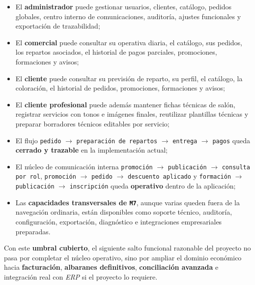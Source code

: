 \begin{itemize}
    \item El \textbf{administrador} puede gestionar usuarios, clientes, catálogo, pedidos globales, centro interno de comunicaciones, auditoría, ajustes funcionales y exportación de trazabilidad;
    \item El \textbf{comercial} puede consultar su operativa diaria, el catálogo, sus pedidos, los repartos asociados, el historial de pagos parciales, promociones, formaciones y avisos;
    \item El \textbf{cliente} puede consultar su previsión de reparto, su perfil, el catálogo, la coloración, el historial de pedidos, promociones, formaciones y avisos;
    \item El \textbf{cliente profesional} puede además mantener fichas técnicas de salón, registrar servicios con tonos e imágenes finales, reutilizar plantillas técnicas y preparar borradores técnicos editables por servicio;
    \item El flujo \texttt{pedido} $\rightarrow$ \texttt{preparación de repartos} $\rightarrow$ \texttt{entrega} $\rightarrow$ \texttt{pagos} queda \textbf{cerrado y trazable} en la implementación actual;
    \item El núcleo de comunicación interna \texttt{promoción} $\rightarrow$ \texttt{publicación} $\rightarrow$ \texttt{consulta por rol}, \texttt{promoción} $\rightarrow$ \texttt{pedido} $\rightarrow$ \texttt{descuento aplicado} y \texttt{formación} $\rightarrow$ \texttt{publicación} $\rightarrow$ \texttt{inscripción} queda \textbf{operativo} dentro de la aplicación;
    \item Las \textbf{capacidades transversales de \texttt{M7}}, aunque varias queden fuera de la navegación ordinaria, están disponibles como soporte técnico, auditoría, configuración, exportación, diagnóstico e integraciones empresariales preparadas.
\end{itemize}

Con este \textbf{umbral cubierto}, el siguiente salto funcional razonable del proyecto no pasa por completar el núcleo operativo, sino por ampliar el dominio económico hacia \textbf{facturación}, \textbf{albaranes definitivos}, \textbf{conciliación avanzada} e integración real con \textit{ERP} si el proyecto lo requiere.
